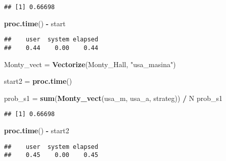 \documentclass[
]{article}
\newenvironment{Shaded}{\begin{snugshade}}{\end{snugshade}}
\newcommand{\KeywordTok}[1]{\textcolor[rgb]{0.13,0.29,0.53}{\textbf{#1}}}
\newcommand{\NormalTok}[1]{#1}
\newcommand{\OperatorTok}[1]{\textcolor[rgb]{0.81,0.36,0.00}{\textbf{#1}}}
\newcommand{\StringTok}[1]{\textcolor[rgb]{0.31,0.60,0.02}{#1}}
\begin{document}
\begin{verbatim}
## [1] 0.66698
\end{verbatim}

\begin{Shaded}
\begin{Highlighting}[]
\KeywordTok{proc.time}\NormalTok{() }\OperatorTok{-}\StringTok{ }\NormalTok{start}
\end{Highlighting}
\end{Shaded}

\begin{verbatim}
##    user  system elapsed 
##    0.44    0.00    0.44
\end{verbatim}

\begin{Shaded}
\begin{Highlighting}[]
\NormalTok{Monty_vect =}\StringTok{ }\KeywordTok{Vectorize}\NormalTok{(Monty_Hall, }\StringTok{"usa_masina"}\NormalTok{)}

\NormalTok{start2 =}\StringTok{ }\KeywordTok{proc.time}\NormalTok{()}

\NormalTok{prob_s1 =}\StringTok{ }\KeywordTok{sum}\NormalTok{(}\KeywordTok{Monty_vect}\NormalTok{(usa_m, usa_a, strateg)) }\OperatorTok{/}\StringTok{ }\NormalTok{N}
\NormalTok{prob_s1}
\end{Highlighting}
\end{Shaded}

\begin{verbatim}
## [1] 0.66698
\end{verbatim}

\begin{Shaded}
\begin{Highlighting}[]
\KeywordTok{proc.time}\NormalTok{() }\OperatorTok{-}\StringTok{ }\NormalTok{start2}
\end{Highlighting}
\end{Shaded}

\begin{verbatim}
##    user  system elapsed 
##    0.45    0.00    0.45
\end{verbatim}
\end{document}
